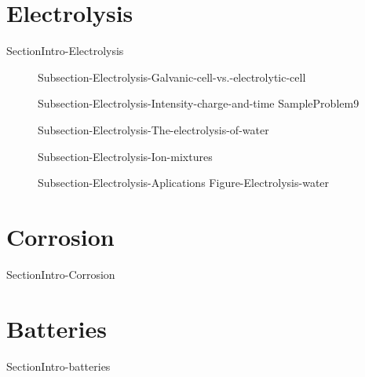 \documentclass[main.tex]{subfiles}
\newcommand\chapterlabel{Ch-electrochem}\setcounter{figurenewcounter}{0}\setcounter{tablenewcounter}{0}\setcounter{formulanewcounter}{0}\chapterpicture{../{\chapterlabel}/figure1}\chapterpicturelabel{PxFuel}
\begin{document}
 \section{Electrolysis}{SectionIntro-Electrolysis}
\sloppy\begin{description}
    \item[] {Subsection-Electrolysis-Galvanic-cell-vs.-electrolytic-cell}
     \item[] {Subsection-Electrolysis-Intensity-charge-and-time}
     {SampleProblem9}

     \item[] {Subsection-Electrolysis-The-electrolysis-of-water}
     \item[] {Subsection-Electrolysis-Ion-mixtures}

     \item[] {Subsection-Electrolysis-Aplications}
     {Figure-Electrolysis-water}\vspace{3cm}

\end{description}


 \section{Corrosion}{SectionIntro-Corrosion}
 \section{Batteries}{SectionIntro-batteries}







\checkoddpage\ifoddpage \clearpage\thispagestyle{empty}\mbox{}\clearpage \else  \fi 
\end{document}
